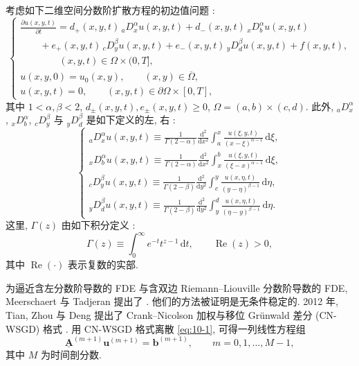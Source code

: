 考虑如下二维空间分数阶扩散方程的初边值问题 \cite{src:62,src:89}:
\begin{equation}
\left\{
\begin{array}{l}
\displaystyle \frac{\partial u(x,y,t)}{\partial t}
 =d_{+}(x,y,t)\,{}_{a}D_{x}^{\alpha}u(x,y,t)+d_{-}(x,y,t)\,{}_{x}D_{b}^{\alpha}u(x,y,t)\\[1.5mm]
\qquad{}+e_{+}(x,y,t)\,{}_{c}D_{y}^{\beta}u(x,y,t)+e_{-}(x,y,t)\,{}_{y}D_{d}^{\beta}u(x,y,t)+f(x,y,t),\\[1.5mm]
\qquad\qquad (x,y,t)\in\Omega\times(0,T],\\[1.5mm]
u(x,y,0)=u_{0}(x,y),\qquad (x,y)\in\overline{\Omega},\\[1.5mm]
u(x,y,t)=0,\qquad (x,y,t)\in\partial\Omega\times[0,T],
\end{array}
\right.
\label{eq:10-1}
\end{equation}
其中 $1<\alpha,\beta<2$, $d_{\pm}(x,y,t),e_{\pm}(x,y,t)\geqslant 0$, $\Omega=(a,b)\times(c,d)$. 此外, ${}_{a}D_{x}^{\alpha}$, ${}_{x}D_{b}^{\alpha}$, ${}_{c}D_{y}^{\beta}$ 与 ${}_{y}D_{d}^{\beta}$ 是如下定义的左, 右 :
\[
\left\{
\begin{array}{l}
\displaystyle {}_{a}D_{x}^{\alpha}u(x,y,t)\equiv\frac{1}{\Gamma(2-\alpha)}\frac{\mathrm{d}^{2}}{\mathrm{d}x^{2}}\int_{a}^{x}\frac{u(\xi,y,t)}{(x-\xi)^{\alpha-1}}\,\mathrm{d}\xi,\\[4mm]
\displaystyle {}_{x}D_{b}^{\alpha}u(x,y,t)\equiv\frac{1}{\Gamma(2-\alpha)}\frac{\mathrm{d}^{2}}{\mathrm{d}x^{2}}\int_{x}^{b}\frac{u(\xi,y,t)}{(\xi-x)^{\alpha-1}}\,\mathrm{d}\xi,\\[4mm]
\displaystyle {}_{c}D_{y}^{\beta}u(x,y,t)\equiv\frac{1}{\Gamma(2-\beta)}\frac{\mathrm{d}^{2}}{\mathrm{d}y^{2}}\int_{c}^{y}\frac{u(x,\eta,t)}{(y-\eta)^{\beta-1}}\,\mathrm{d}\eta,\\[4mm]
\displaystyle {}_{y}D_{d}^{\beta}u(x,y,t)\equiv\frac{1}{\Gamma(2-\beta)}\frac{\mathrm{d}^{2}}{\mathrm{d}y^{2}}\int_{y}^{d}\frac{u(x,\eta,t)}{(\eta-y)^{\beta-1}}\,\mathrm{d}\eta.
\end{array}
\right.
\]
这里,  $\Gamma(z)$ 由如下积分定义 \cite{src:68}:
\[
  \Gamma(z)\equiv\int_{0}^{\infty}e^{-t}t^{z-1}\,\mathrm{d}t,\qquad\operatorname{Re}(z)>0,
\]
其中 $\operatorname{Re}(\cdot)$ 表示复数的实部.

为逼近含左分数阶导数的 FDE 与含双边 Riemann--Liouville 分数阶导数的 FDE, Meerschaert 与 Tadjeran 提出了  \cite{src:61,src:62}. 他们的方法被证明是无条件稳定的. 2012 年, Tian, Zhou 与 Deng 提出了 Crank--Nicolson 加权与移位 Grünwald 差分 (CN-WSGD) 格式 \cite{src:79}. 用 CN-WSGD 格式离散 \eqref{eq:10-1}, 可得一列线性方程组
\[
  \underline{\mathbf{A}}^{(m+1)}\mathbf{u}^{(m+1)}=\mathbf{b}^{(m+1)},\qquad m=0,1,\ldots,M-1,
\]
其中 $M$ 为时间剖分数.

